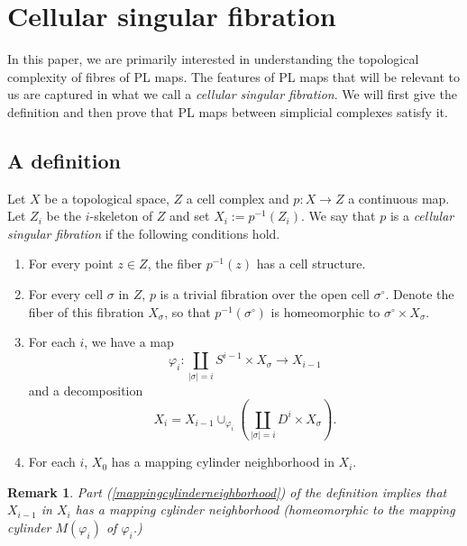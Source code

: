 \documentclass[11pt,letterpaper]{amsart}
\newtheorem*{defn}{Definition}
\newtheorem*{remark}{Remark}
\begin{document}
\section{Cellular singular fibration\label{sqf}}
In this paper, we are primarily interested in understanding the topological complexity of fibres of PL maps. The features of PL maps that will be relevant to us are captured in what we call a {\it cellular singular fibration}. We will first give the definition and then prove that PL maps between simplicial complexes satisfy it. 
\subsection{A definition}
Let $X$ be a topological space, $Z$ a cell complex and $p:X\rightarrow Z$ a continuous map. Let $Z_i$ be the $i$-skeleton of $Z$ and set $X_i:=p^{-1}(Z_i)$. We say that $p$ is a {\it cellular singular fibration} if the following conditions hold. 
\begin{enumerate}
\item 
\label{baryfib}
For every point $z\in Z$, the fiber $p^{-1}(z)$ has a cell structure.
\item 
\label{trivfiber}
For every cell $\sigma$ in $Z$, $p$ is a trivial fibration over the open cell $\sigma^{\circ}$. Denote the fiber of this fibration $X_{\sigma}$, so that $p^{-1}(\sigma^\circ)$ is homeomorphic to $\sigma^\circ\times X_{\sigma}$.  
\item 
\label{mappingcylinderneighborhood}
For each $i$, we have a map%
$$
\varphi_i:\coprod_{|\sigma|=i}S^{i-1}\times X_{\sigma}\rightarrow X_{i-1}
$$
and a decomposition 
$$
X_i=X_{i-1}\cup_{\varphi_i}\left(\coprod_{|\sigma|=i}D^i\times X_{\sigma}\right).
$$ 
\item 
\label{regnbhd}
For each $i$, $X_0$ has a mapping cylinder neighborhood in $X_i$.
\end{enumerate}
\begin{remark}
Part (\ref{mappingcylinderneighborhood}) of the definition implies that $X_{i-1}$ in $X_i$ has a mapping cylinder neighborhood (homeomorphic to the mapping cylinder $M(\varphi_i)$ of $\varphi_i$.)
\end{remark}
\end{document}
